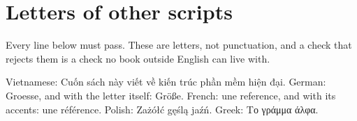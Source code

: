 \section{Letters of other scripts}
\label{sec:ch01-letters}

Every line below must pass. These are letters, not punctuation, and a check
that rejects them is a check no book outside English can live with.

Vietnamese: Cuốn sách này viết về kiến trúc phần mềm hiện đại.
German: Groesse, and with the letter itself: Größe.
French: une reference, and with its accents: une référence.
Polish: Zażółć gęślą jaźń.
Greek: Το γράμμα άλφα.
